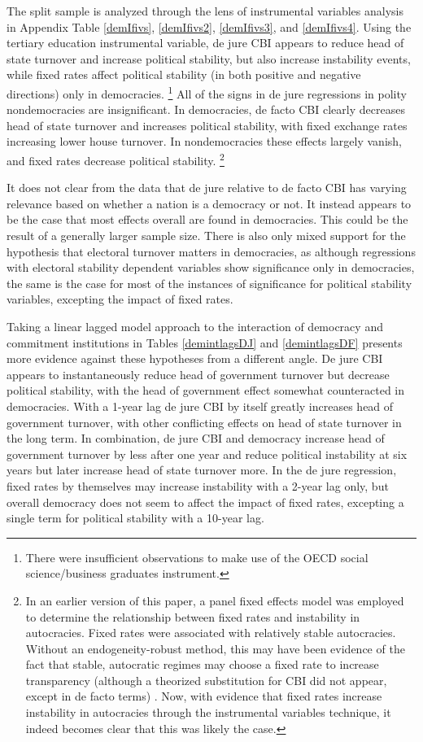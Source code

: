 \documentclass{article}
\begin{document}
    The split sample is analyzed through the lens of instrumental variables analysis in Appendix Table \ref*{demIfivs}, \ref*{demIfivs2}, \ref{demIfivs3}, and \ref*{demIfivs4}. Using the tertiary education instrumental variable, de jure CBI appears to reduce head of state turnover and increase political stability, but also increase instability events, while fixed rates affect political stability (in both positive and negative directions) only in democracies. \footnote{There were insufficient observations to make use of the OECD social science/business graduates instrument.} All of the signs in de jure regressions in polity nondemocracies are insignificant. In democracies, de facto CBI clearly decreases head of state turnover and increases political stability, with fixed exchange rates increasing lower house turnover. In nondemocracies these effects largely vanish, and fixed rates decrease political stability. \footnote{In an earlier version of this paper, a panel fixed effects model was employed to determine the relationship between fixed rates and instability in autocracies. Fixed rates were associated with relatively stable autocracies. Without an endogeneity-robust method, this may have been evidence of the fact that stable, autocratic regimes may choose a fixed rate to increase transparency (although a theorized substitution for CBI did not appear, except in de facto terms) \citep{broz_political_2002}. Now, with evidence that fixed rates increase instability in autocracies through the instrumental variables technique, it indeed becomes clear that this was likely the case.}

    It does not clear from the data that de jure relative to de facto CBI has varying relevance based on whether a nation is a democracy or not. It instead appears to be the case that most effects overall are found in democracies. This could be the result of a generally larger sample size. There is also only mixed support for the hypothesis that electoral turnover matters in democracies, as although regressions with electoral stability dependent variables show significance only in democracies, the same is the case for most of the instances of significance for political stability variables, excepting the impact of fixed rates.

    Taking a linear lagged model approach to the interaction of democracy and commitment institutions in Tables \ref*{demintlagsDJ} and \ref*{demintlagsDF} presents more evidence against these hypotheses from a different angle. De jure CBI appears to instantaneously reduce head of government turnover but decrease political stability, with the head of government effect somewhat counteracted in democracies. With a 1-year lag de jure CBI by itself greatly increases head of government turnover, with other conflicting effects on head of state turnover in the long term. In combination, de jure CBI and democracy increase head of government turnover by less after one year and reduce political instability at six years but later increase head of state turnover more. In the de jure regression, fixed rates by themselves may increase instability with a 2-year lag only, but overall democracy does not seem to affect the impact of fixed rates, excepting a single term for political stability with a 10-year lag.
\end{document}
